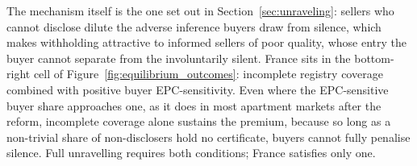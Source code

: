 The mechanism itself is the one set out in Section~\ref{sec:unraveling}: sellers who cannot
disclose dilute the adverse inference buyers draw from silence, which makes withholding
attractive to informed sellers of poor quality, whose entry the buyer cannot separate from
the involuntarily silent. France sits in the bottom-right cell of
Figure~\ref{fig:equilibrium_outcomes}: incomplete registry coverage combined with positive
buyer EPC-sensitivity. Even where the EPC-sensitive buyer share approaches one, as it does in
most apartment markets after the reform, incomplete coverage alone sustains the premium, because
so long as a non-trivial share of non-disclosers hold no certificate, buyers cannot fully
penalise silence. Full unravelling requires both conditions; France satisfies only one.
